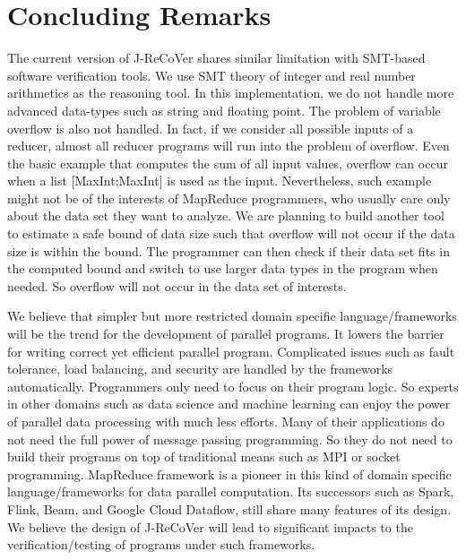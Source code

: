 \documentclass{llncs}
\begin{document}
\section{Concluding Remarks}

The current version of J-ReCoVer shares similar limitation with SMT-based software verification tools.
We use SMT theory of integer and real number arithmetics as the reasoning tool. In this implementation, we do not handle more advanced data-types such as string and floating point. The problem of variable overflow is also not handled. In fact, if we consider all possible inputs of a reducer, almost all reducer programs will run into the problem of overflow. Even the basic example that computes the sum of all input values, overflow can occur when a list [\textsf{MaxInt};\textsf{MaxInt}] is used as the input. Nevertheless, such example might not be of the interests of MapReduce programmers, who usually care only about the data set they want to analyze. We are planning to build another tool to estimate a safe bound of data size such that overflow will not occur if the data size is within the bound. The programmer can then check if their data set fits in the computed bound and switch to use larger data types in the program when needed. So overflow will not occur in the data set of interests.

We believe that simpler but more restricted domain specific language/frameworks will be the trend for the development of parallel programs. It lowers the barrier for writing correct yet efficient parallel program. Complicated issues such as fault tolerance, load balancing, and security are handled by the frameworks automatically. Programmers only need to focus on their program logic. So experts in other domains such as data science and machine learning can enjoy the power of parallel data processing with much less efforts. Many of their applications do not need the full power of message passing programming. So they do not need to build their programs on top of traditional means such as MPI or socket programming. MapReduce framework is a pioneer in this kind of domain specific language/frameworks for data parallel computation. Its successors such as Spark, Flink, Beam, and Google Cloud Dataflow, still share many features of its design. We believe the design of J-ReCoVer will lead to significant impacts to the verification/testing of programs under such frameworks.





\end{document}
